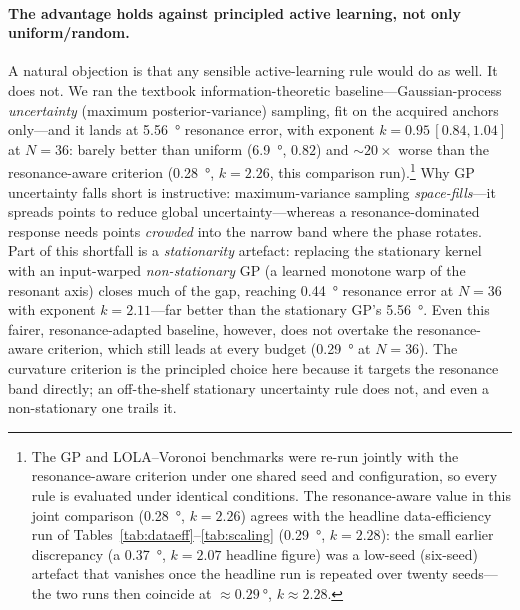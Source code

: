 \documentclass[11pt]{article}
\begin{document}
\paragraph{The advantage holds against principled active learning, not only uniform/random.} A natural
objection is that any sensible active-learning rule would do as well. It does not. We ran the textbook
information-theoretic baseline---Gaussian-process \emph{uncertainty} (maximum posterior-variance) sampling,
fit on the acquired anchors only---and it lands at \SI{5.56}{\degree} resonance error, with exponent
$k\!=\!0.95\,[0.84,1.04]$ at $N\!=\!36$: barely better than uniform (\SI{6.9}{\degree}, $0.82$) and
$\sim\!20\times$ worse than the resonance-aware criterion (\SI{0.28}{\degree}, $k\!=\!2.26$, this comparison run).\footnote{The GP and LOLA--Voronoi benchmarks were re-run jointly with the resonance-aware criterion under one shared seed and configuration, so every rule is evaluated under identical conditions. The resonance-aware value in this joint comparison (\SI{0.28}{\degree}, $k\!=\!2.26$) agrees with the headline data-efficiency run of Tables~\ref{tab:dataeff}--\ref{tab:scaling} (\SI{0.29}{\degree}, $k\!=\!2.28$): the small earlier discrepancy (a \SI{0.37}{\degree}, $k\!=\!2.07$ headline figure) was a low-seed (six-seed) artefact that vanishes once the headline run is repeated over twenty seeds---the two runs then coincide at $\approx\!\SI{0.29}{\degree}$, $k\!\approx\!2.28$.} Why GP uncertainty falls short is
instructive: maximum-variance sampling \emph{space-fills}---it spreads points to reduce global
uncertainty---whereas a resonance-dominated response needs points \emph{crowded} into the narrow band where
the phase rotates. Part of this shortfall is a \emph{stationarity} artefact: replacing the stationary kernel
with an input-warped \emph{non-stationary} GP (a learned monotone warp of the resonant axis) closes much of
the gap, reaching \SI{0.44}{\degree} resonance error at $N\!=\!36$ with exponent $k\!=\!2.11$---far better
than the stationary GP's \SI{5.56}{\degree}. Even this fairer, resonance-adapted baseline, however, does not
overtake the resonance-aware criterion, which still leads at every budget (\SI{0.29}{\degree} at $N\!=\!36$).
The curvature criterion is the principled choice here because it targets the resonance band
directly; an off-the-shelf stationary uncertainty rule does not, and even a non-stationary one trails it.
\end{document}
